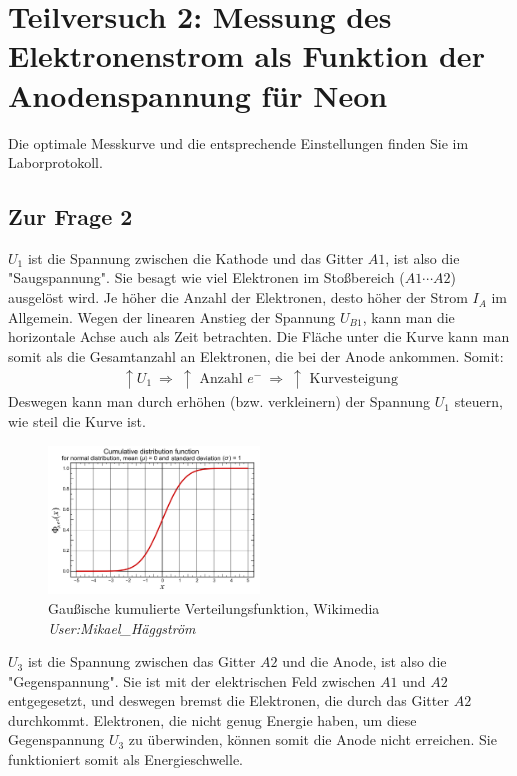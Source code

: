 \section{Teilversuch 2: Messung des Elektronenstrom als Funktion der Anodenspannung für Neon}
	Die optimale Messkurve und die entsprechende Einstellungen finden Sie im Laborprotokoll. 

	\subsection{Zur Frage 2}
		$U_1$ ist die Spannung zwischen die Kathode und das Gitter $A1$, ist also die "Saugspannung". Sie besagt wie viel Elektronen im Stoßbereich ($A1 \cdots A2$) ausgelöst wird. Je höher die Anzahl der Elektronen, desto höher der Strom $I_A$ im Allgemein. Wegen der linearen Anstieg der Spannung $U_{B1}$, kann man die horizontale Achse auch als Zeit betrachten. Die Fläche unter die Kurve kann man somit als die Gesamtanzahl an Elektronen, die bei der Anode ankommen. Somit:
		\begin{align}
			\uparrow U_1 ~\Rightarrow~ \uparrow \text{ Anzahl }e^- ~\Rightarrow~ \uparrow \text{ Kurvesteigung}
		\end{align}
		Deswegen kann man durch erhöhen (bzw. verkleinern) der Spannung $U_1$ steuern, wie steil die Kurve ist. 

		\begin{figure} 
		    \centering
		    \vspace{-2em}
		    \includegraphics[width=0.5\textwidth]{images/gauss_cdf.png}
		    \vspace{-1em}
		    \caption{Gaußische kumulierte Verteilungsfunktion, \cczero{} Wikimedia \textit{User:Mikael\_Häggström}}
		    \vspace{-2em}
		    \label{fig:gauss-cdf}
		\end{figure}

		$U_3$ ist die Spannung zwischen das Gitter $A2$ und die Anode, ist also die "Gegenspannung". Sie ist mit der elektrischen Feld zwischen $A1$ und $A2$ entgegesetzt, und deswegen bremst die Elektronen, die durch das Gitter $A2$ durchkommt. Elektronen, die nicht genug Energie haben, um diese Gegenspannung $U_3$ zu überwinden, können somit die Anode nicht erreichen. Sie funktioniert somit als Energieschwelle. 

